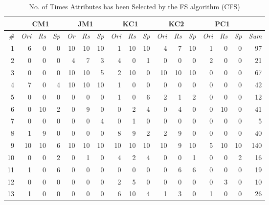 \documentclass{elsart}
\begin{document}
\begin{table}[t]
\caption{No. of Times Attributes has been Selected by the FS
algorithm (CFS)} \label{tab:noOfTimesAttr}
\begin{center}
\begin{scriptsize}
\begin{tabular}{r|rrr|rrr|rrr|rrr|rrr|r}
\hline
\multicolumn{1}{c}{}& \multicolumn{3}{c}{CM1} & \multicolumn{3}{c}{JM1} & \multicolumn{3}{c}{KC1} & \multicolumn{3}{c}{KC2} & \multicolumn{3}{c}{PC1} \\
\hline
   \emph{\#}& \emph{Ori} & \emph{Rs} & \emph{Sp} & \emph{Or} & \emph{Rs} & \emph{Sp} &  \emph{Ori} &  \emph{Rs} &  \emph{Sp} &  \emph{Ori} &   \emph{Rs} &  \emph{Sp} &  \emph{Ori} &  \emph{Rs} &  \emph{Sp} & \emph{Sum}\\
\hline \hline
  1 &   6 &    0 &  0 &  10 &   10 &  10 &   1 &  10 &  10 &   4 &   7 &  10 &   1 &   0 &   0  & 97\\
  2 &   0 &    0 &  0 &   4 &    7 &   3 &   4 &   0 &   1 &   0 &   0 &   0 &   2 &   0 &   0 & 21\\
  3 &   0 &    0 &  0 &  10 &   10 &   5 &   2 &  10 &   0 &  10 &  10 &  10 &   0 &   0 &   0 & 67\\
  4 &   7 &    0 &  4 &  10 &   10 &  10 &   1 &   0 &   0 &   0 &   0 &   0 &   0 &   0 &   0 & 42\\
  5 &   0 &    0 &  0 &   0 &    0 &   0 &   1 &   0 &   6 &   2 &   1 &   2 &   0 &   0 &   0 & 12\\
  6 &   0 &   10 &  2 &   0 &    9 &   0 &   0 &   2 &   4 &   0 &   4 &   0 &   0 &  10 &   0 & 41\\
  7 &   0 &    0 &  0 &   0 &    0 &   4 &   0 &   1 &   0 &   0 &   0 &   0 &   0 &   0 &   0 &  5\\
  8 &   1 &    9 &  0 &   0 &    0 &   0 &   8 &   9 &   2 &   2 &   9 &   0 &   0 &   0 &   0 & 40\\
  9 &  10 &   10 &  6 &  10 &   10 &  10 &  10 &  10 &  10 &  10 &   9 &  10 &   5 &  10 &  10 & 140\\
  10 &   0 &    0 &  2 &   0 &    1 &   0 &   4 &   2 &   4 &   0 &   0 &   1 &   0 &   0 &   2 & 16\\
  11 &   1 &    0 &  6 &   0 &    0 &   0 &   0 &   0 &   0 &   0 &   6 &   6 &   0 &   0 &   0 & 19\\
  12 &   0 &    0 &  0 &   0 &    0 &   0 &   2 &   5 &   0 &   0 &   0 &   0 &   0 &   3 &   0 & 10\\
  13 &   1 &    0 &  0 &   0 &    0 &   0 &   6 &  10 &   4 &   1 &   3 &   0 &   1 &   0 &   0 & 26\\

\end{tabular}
\end{scriptsize}
\end{center}
\end{table}
\end{document}
